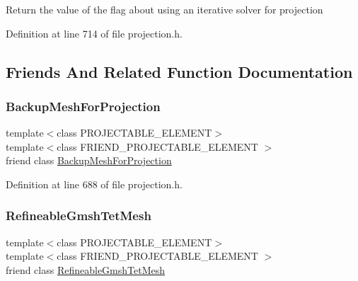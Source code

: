 Return the value of the flag about using an iterative solver for projection 

Definition at line 714 of file projection.\+h.



\subsection{Friends And Related Function Documentation}
\mbox{\label{classoomph_1_1ProjectionProblem_a01ad4b9aac17e6b8e251ce52ba21bfe4}} 
\subsubsection{\texorpdfstring{Backup\+Mesh\+For\+Projection}{BackupMeshForProjection}}
{\footnotesize\ttfamily template$<$class P\+R\+O\+J\+E\+C\+T\+A\+B\+L\+E\+\_\+\+E\+L\+E\+M\+E\+NT$>$ \\
template$<$class F\+R\+I\+E\+N\+D\+\_\+\+P\+R\+O\+J\+E\+C\+T\+A\+B\+L\+E\+\_\+\+E\+L\+E\+M\+E\+NT $>$ \\
friend class \hyperlink{classoomph_1_1BackupMeshForProjection}{Backup\+Mesh\+For\+Projection}\hspace{0.3cm}{\ttfamily [friend]}}



Definition at line 688 of file projection.\+h.

\mbox{\label{classoomph_1_1ProjectionProblem_a933521be2c09eb1842625109de7a8b66}} 
\subsubsection{\texorpdfstring{Refineable\+Gmsh\+Tet\+Mesh}{RefineableGmshTetMesh}}
{\footnotesize\ttfamily template$<$class P\+R\+O\+J\+E\+C\+T\+A\+B\+L\+E\+\_\+\+E\+L\+E\+M\+E\+NT$>$ \\
template$<$class F\+R\+I\+E\+N\+D\+\_\+\+P\+R\+O\+J\+E\+C\+T\+A\+B\+L\+E\+\_\+\+E\+L\+E\+M\+E\+NT $>$ \\
friend class \hyperlink{classoomph_1_1RefineableGmshTetMesh}{Refineable\+Gmsh\+Tet\+Mesh}\hspace{0.3cm}{\ttfamily [friend]}}




